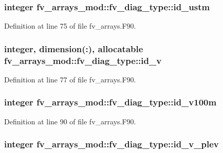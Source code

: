 \subsubsection[{id\-\_\-ustm}]{\setlength{\rightskip}{0pt plus 5cm}integer fv\-\_\-arrays\-\_\-mod\-::fv\-\_\-diag\-\_\-type\-::id\-\_\-ustm}\label{structfv__arrays__mod_1_1fv__diag__type_ae0138627f0c753814f42290b958d72ec}


Definition at line 75 of file fv\-\_\-arrays.\-F90.

\subsubsection[{id\-\_\-v}]{\setlength{\rightskip}{0pt plus 5cm}integer, dimension(\-:), allocatable fv\-\_\-arrays\-\_\-mod\-::fv\-\_\-diag\-\_\-type\-::id\-\_\-v}\label{structfv__arrays__mod_1_1fv__diag__type_afe1d5ee644c08fc85ab9f382b560c008}


Definition at line 77 of file fv\-\_\-arrays.\-F90.

\subsubsection[{id\-\_\-v100m}]{\setlength{\rightskip}{0pt plus 5cm}integer fv\-\_\-arrays\-\_\-mod\-::fv\-\_\-diag\-\_\-type\-::id\-\_\-v100m}\label{structfv__arrays__mod_1_1fv__diag__type_a7901dc1f4f2b261febf73e0064a0e703}


Definition at line 90 of file fv\-\_\-arrays.\-F90.

\subsubsection[{id\-\_\-v\-\_\-plev}]{\setlength{\rightskip}{0pt plus 5cm}integer fv\-\_\-arrays\-\_\-mod\-::fv\-\_\-diag\-\_\-type\-::id\-\_\-v\-\_\-plev}\label{structfv__arrays__mod_1_1fv__diag__type_a3a481ce94324a088e5a6e832562bb226}


